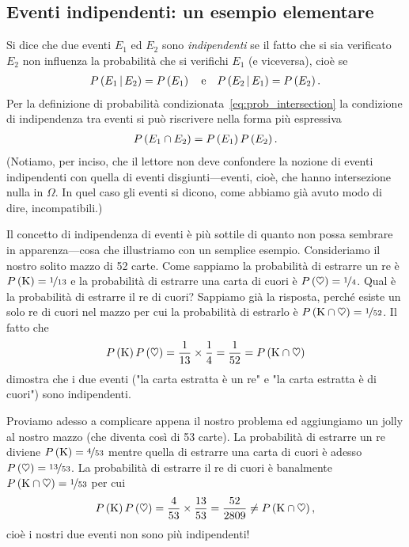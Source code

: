 \subsection{Eventi indipendenti: un esempio elementare}

Si dice che due eventi $E_1$ ed $E_2$ sono \emph{indipendenti} se il fatto
che si sia verificato $E_2$ non influenza la probabilità che si verifichi
$E_1$ (e viceversa), cioè se
\begin{align}\label{eq:indipendenza_eventi}
  \displaystyle P\left(E_1 \,|\, E_2\right) = \displaystyle P\left(E_1\right) \quad \text{e} \quad
  \displaystyle P\left(E_2 \,|\, E_1\right) = \displaystyle P\left(E_2\right).
\end{align}
Per la definizione di probabilità condizionata~\eqref{eq:prob_intersection}
la condizione di indipendenza tra eventi si può riscrivere nella forma
più espressiva
\begin{align}\label{eq:prob_mult_ind}
  \displaystyle P\left(E_1 \cap E_2\right) = \displaystyle P\left(E_1\right)\displaystyle P\left(E_2\right).
\end{align}
(Notiamo, per inciso, che il lettore non deve confondere la nozione di eventi
indipendenti con quella di eventi disgiunti---eventi, cioè, che hanno
intersezione nulla in $\Omega$. In quel caso gli eventi si dicono, come abbiamo
già avuto modo di dire, incompatibili.)

Il concetto di indipendenza di eventi è più sottile di quanto non possa
sembrare in apparenza---cosa che illustriamo con un semplice esempio.
Consideriamo il nostro solito mazzo di 52 carte. Come sappiamo la probabilità
di estrarre un re è $\displaystyle P\left(\text{K}\right) = \nicefrac{1}{13}$ e la probabilità
di estrarre una carta di cuori è $\displaystyle P\left(\heartsuit\right) = \nicefrac{1}{4}$.
Qual è la probabilità di estrarre il re di cuori? Sappiamo già la
risposta, perché esiste un solo re di cuori nel mazzo per cui la probabilità
di estrarlo è $\displaystyle P\left(\text{K} \cap \heartsuit\right) = \nicefrac{1}{52}$. Il fatto
che
\begin{align*}
  \displaystyle P\left(\text{K}\right) \displaystyle P\left(\heartsuit\right) =
  \frac{1}{13}\times\frac{1}{4} =
  \frac{1}{52} = \displaystyle P\left(\text{K} \cap \heartsuit\right)
\end{align*}
dimostra che i due eventi ("la carta estratta è un re" e "la carta
estratta è di cuori") sono indipendenti.

Proviamo adesso a complicare appena il nostro problema ed aggiungiamo un jolly
al nostro mazzo (che diventa così di 53 carte). La probabilità di estrarre
un re diviene $\displaystyle P\left(\text{K}\right) = \nicefrac{4}{53}$ mentre quella di estrarre
una carta di cuori è adesso $\displaystyle P\left(\heartsuit\right) = \nicefrac{13}{53}$. La
probabilità di estrarre il re di cuori è banalmente
$\displaystyle P\left(\text{K} \cap \heartsuit\right) = \nicefrac{1}{53}$ per cui
\begin{align*}
  \displaystyle P\left(\text{K}\right) \displaystyle P\left(\heartsuit\right) =
  \frac{4}{53}\times\frac{13}{53} =
  \frac{52}{2809} \neq \displaystyle P\left(\text{K} \cap \heartsuit\right),
\end{align*}
cioè i nostri due eventi non sono più indipendenti!

